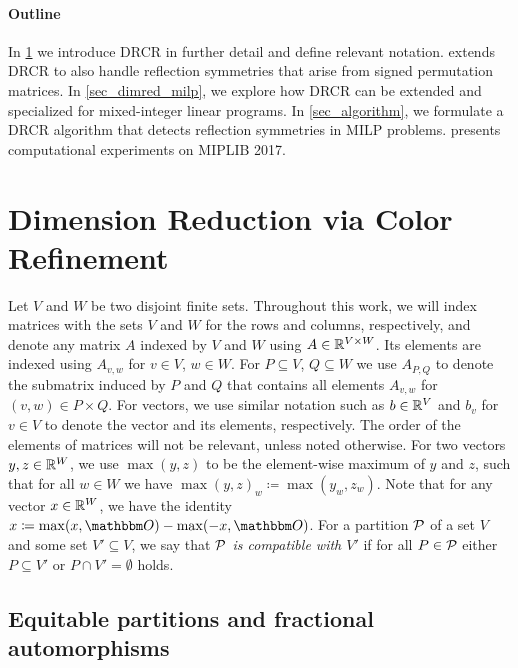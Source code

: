 \documentclass[pdflatex,sn-mathphys-num]{sn-jnl}%
\theoremstyle{thmstyleone}%
\theoremstyle{thmstylethree}%
\theoremstyle{thmstyletwo}%
\begin{document}
\paragraph{Outline}
In \cref{sec_notation} we introduce DRCR in further detail and define relevant notation.
 extends DRCR to also handle reflection symmetries that arise from signed permutation matrices. In \cref{sec_dimred_milp}, we explore how DRCR can be extended and specialized for mixed-integer linear programs. In \cref{sec_algorithm}, we formulate a DRCR algorithm that detects reflection symmetries in MILP problems. 
 presents computational experiments on MIPLIB 2017. 



\section{Dimension Reduction via Color Refinement}
\label{sec_notation}

Let $V$ and $W$ be two disjoint finite sets. Throughout this work, we will index matrices with the sets $V$ and $W$ for the rows and columns, respectively, and denote any matrix $A$ indexed by $V$ and $W$ using $A\in \mathbb{R}^{V\times W}$. Its elements are indexed using $A_{v,w}$ for $v\in V$, $w\in W$. For $P\subseteq V$, $Q\subseteq W$ we use $A_{P,Q}$ to denote the submatrix induced by $P$ and $Q$ that contains all elements $A_{v,w}$ for $(v,w) \in P\times Q$. For vectors, we use similar notation such as $b\in \mathbb{R}^V$ and $b_v$ for $v\in V$ to denote the vector and its elements, respectively. The order of the elements of matrices will not be relevant, unless noted otherwise.
For two vectors $y,z \in \mathbb{R}^W$, we use $\max(y,z)$ to be the element-wise maximum of $y$ and $z$, such that for all $w\in W$ we have $\max(y,z)_w \coloneqq \max(y_w,z_w)$. Note that for any vector $x\in \mathbb{R}^W$, we have the identity $x \coloneqq \max(x,\zerovec) - \max(-x,\zerovec)$.
For a partition $\mathcal{P}$ of a set $V$ and some set $V'\subseteq V$, we say that \emph{$\mathcal{P}$ is compatible with $V'$} if for all $P\in \mathcal{P}$ either $P\subseteq V'$ or $P\cap V' = \emptyset$ holds.

\subsection{Equitable partitions and fractional automorphisms}
\end{document}
